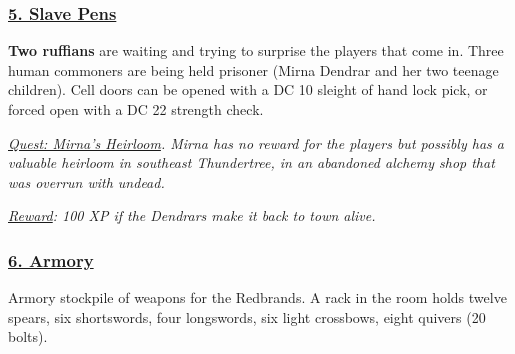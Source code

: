 \subsubsection*{\underline{5. Slave Pens}}
\textbf{Two ruffians} are waiting and trying to surprise the players that come in. Three human commoners are being held prisoner (Mirna Dendrar and her two teenage children). Cell doors can be opened with a DC 10 sleight of hand lock pick, or forced open with a DC 22 strength check.

\emph{\underline{Quest: Mirna's Heirloom}. Mirna has no reward for the players but possibly has a valuable heirloom in southeast Thundertree, in an abandoned alchemy shop that was overrun with undead. }

\emph{\underline{Reward}: 100 XP if the Dendrars make it back to town alive.}

\subsubsection*{\underline{6. Armory}}
Armory stockpile of weapons for the Redbrands. A rack in the room holds twelve spears, six shortswords, four longswords, six light crossbows, eight quivers (20 bolts).



